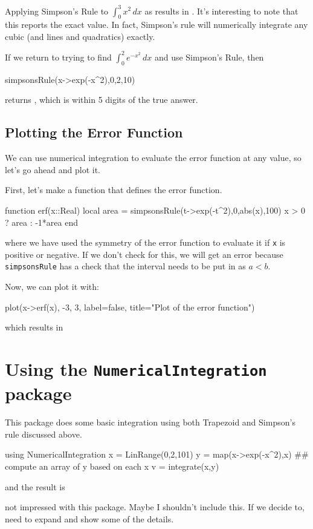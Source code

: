 Applying Simpson's Rule to $\int_0^3 x^2 \, dx$ as  results in  \printpythontex[verb].  It's interesting to note that this reports the exact value.  In fact, Simpson's rule will numerically integrate any cubic (and lines and quadratics) exactly.  

If we return to trying to find $\int_0^2 e^{-x^2} \, dx$ and use Simpson's Rule, then 
\begin{jlblock}[numint]
simpsonsRule(x->exp(-x^2),0,2,10)
\end{jlblock}
returns  \printpythontex, which is within 5 digits of the true answer.  

\subsection{Plotting the Error Function}

We can use numerical integration to evaluate the error function at any value, so let's go ahead and plot it. 

First, let's make a function that defines the error function. 

\begin{jlblock}[numint]
function erf(x::Real)
  local area = simpsonsRule(t->exp(-t^2),0,abs(x),100)
  x > 0 ? area : -1*area
end
\end{jlblock}
where we have used the symmetry of the error function to evaluate it if \verb!x! is positive or negative.  If we don't check for this, we will get an error because \verb!simpsonsRule! has a check that the interval needs to be put in as $a<b$.  


Now, we can plot it with:
\begin{jlblock}[numint]
plot(x->erf(x), -3, 3, label=false, title="Plot of the error function")
\end{jlblock}
which results in 
\begin{center}
\end{center}


\section{Using the \texttt{NumericalIntegration} package} 

This package does some basic integration using both Trapezoid and Simpson's rule discussed above. 
\begin{jlblock}
using NumericalIntegration
x = LinRange(0,2,101)
y = map(x->exp(-x^2),x) ## compute an array of y based on each x
v = integrate(x,y)
\end{jlblock}
and the result is  \printpythontex


{\color{red} not impressed with this package. Maybe I shouldn't include this.  If we decide to, need to expand and show some of the details.} 
